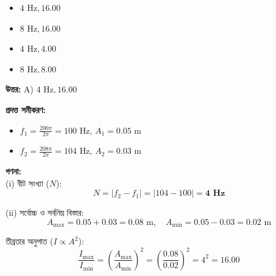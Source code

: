 \documentclass[12pt, a4paper]{article}
\begin{document}
\begin{itemize}[label={}, leftmargin=1cm, itemsep=0.5em]
    \item[\textbf{A)}] $4\text{ Hz}, 16.00$
    \item[\textbf{B)}] $8\text{ Hz}, 16.00$
    \item[\textbf{C)}] $4\text{ Hz}, 4.00$
    \item[\textbf{D)}] $8\text{ Hz}, 8.00$
\end{itemize}

\vspace{0.5em}
\begin{tcolorbox}[answerbox]
    \textbf{\color{success} উত্তর:} A) $4\text{ Hz}, 16.00$
\end{tcolorbox}
\vspace{1em}

\begin{tcolorbox}[solutionbox={সমাধান (Solution)}]
    \noindent
    \textbf{প্রদত্ত সমীকরণ:}
    \begin{itemize}[leftmargin=1.5em, itemsep=0.2em]
        \item $f_1 = \frac{200\pi}{2\pi} = 100\text{ Hz}$, $A_1 = 0.05\text{ m}$
        \item $f_2 = \frac{208\pi}{2\pi} = 104\text{ Hz}$, $A_2 = 0.03\text{ m}$
    \end{itemize}

    \vspace{0.6em}
    \noindent\textbf{গণনা:} \\
    (i) বীট সংখ্যা ($N$):
    \[ N = |f_2 - f_1| = |104 - 100| = \mathbf{4\text{ Hz}} \]
    
    (ii) সর্বোচ্চ ও সর্বনিম্ন বিস্তার:
    \[ A_{\text{max}} = 0.05 + 0.03 = 0.08\text{ m}, \quad A_{\text{min}} = 0.05 - 0.03 = 0.02\text{ m} \]
    
    তীব্রতার অনুপাত ($I \propto A^2$):
    \[ \frac{I_{\text{max}}}{I_{\text{min}}} = \left(\frac{A_{\text{max}}}{A_{\text{min}}}\right)^2 = \left(\frac{0.08}{0.02}\right)^2 = 4^2 = \mathbf{16.00} \]
\end{tcolorbox}
\end{document}
